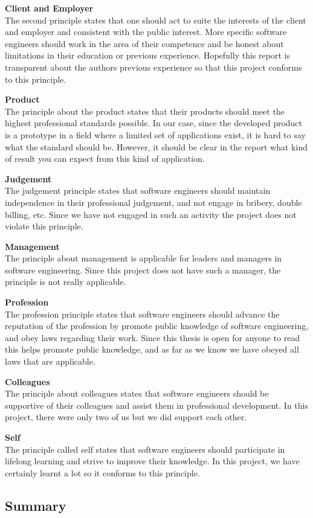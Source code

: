 \documentclass[12pt, a4paper, onecolumn]{article}
\newcommand{\parag}[1]{
	\textbf{#1} \hspace{0pt} \\
}
\begin{document}
	\parag{Client and Employer}
	The second principle states that one should act to suite the interests of the client and employer and consistent with the public interest. More specific software engineers should work in the area of their competence and be honest about limitations in their education or previous experience. Hopefully this report is transparent about the authors previous experience so that this project conforms to this principle.
	
	\parag{Product}
	The principle about the product states that their products should meet the highest professional standards possible. In our case, since the developed product is a prototype in a field where a limited set of applications exist, it is hard to say what the standard should be. However, it should be clear in the report what kind of result you can expect from this kind of application.
	
	\parag{Judgement}
	The judgement principle states that software engineers should maintain independence in their professional judgement, and not engage in bribery, double billing, etc. Since we have not engaged in such an activity the project does not violate this principle.
	
	\parag{Management}
	The principle about management is applicable for leaders and managers in software engineering. Since this project does not have such a manager, the principle is not really applicable.
	
	\parag{Profession}
	The profession principle states that software engineers should advance the reputation of the profession by promote public knowledge of software engineering, and obey laws regarding their work. Since this thesis is open for anyone to read this helps promote public knowledge, and as far as we know we have obeyed all laws that are applicable.
	
	\parag{Colleagues}
	The principle about colleagues states that software engineers should be supportive of their colleagues and assist them in professional development. In this project, there were only two of us but we did support each other.
	
	\parag{Self}
	The principle called self states that software engineers should participate in lifelong learning and strive to improve their knowledge. In this project, we have certainly learnt a lot so it conforms to this principle.
	
	\subsection{Summary}
	
\end{document}
